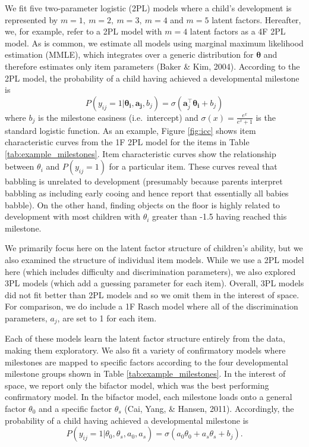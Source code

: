 \documentclass[10pt, letterpaper]{article}
\begin{document}
We fit five two-parameter logistic (2PL) models where a child's
development is represented by \(m = 1, \ m = 2, \ m = 3, \ m = 4\) and
\(m = 5\) latent factors. Hereafter, we, for example, refer to a 2PL
model with \(m = 4\) latent factors as a 4F 2PL model. As is common, we
estimate all models using marginal maximum likelihood estimation (MMLE),
which integrates over a generic distribution for \(\boldsymbol{\theta}\)
and therefore estimates only item parameters (Baker \& Kim, 2004).
According to the 2PL model, the probability of a child having achieved a
developmental milestone is \[
P(y_{ij} = 1 | \boldsymbol{\theta_i}, \boldsymbol{a_j}, b_j) = \sigma(\boldsymbol{a}_{j}^{\top}\boldsymbol{\theta_i} + b_j)
\] where \(b_j\) is the milestone easiness (i.e.~intercept) and
\(\sigma(x) = \frac{e^x}{e^x + 1}\) is the standard logistic function.
As an example, Figure \ref{fig:icc} shows item characteristic curves
from the 1F 2PL model for the items in Table
\ref{tab:example_milestones}. Item characteristic curves show the
relationship between \(\theta_i\) and \(P(y_{ij} = 1)\) for a particular
item. These curves reveal that babbling is unrelated to development
(presumably because parents interpret babbling as including early cooing
and hence report that essentially all babies babble). On the other hand,
finding objects on the floor is highly related to development with most
children with \(\theta_i\) greater than -1.5 having reached this
milestone.

We primarily focus here on the latent factor structure of children's
ability, but we also examined the structure of individual item models.
While we use a 2PL model here (which includes difficulty and
discrimination parameters), we also explored 3PL models (which add a
guessing parameter for each item). Overall, 3PL models did not fit
better than 2PL models and so we omit them in the interest of space. For
comparison, we do include a 1F Rasch model where all of the
discrimination parameters, \(a_j\), are set to 1 for each item.

Each of these models learn the latent factor structure entirely from the
data, making them exploratory. We also fit a variety of confirmatory
models where milestones are mapped to specific factors according to the
four developmental milestone groups shown in Table
\ref{tab:example_milestones}. In the interest of space, we report only
the bifactor model, which was the best performing confirmatory model. In
the bifactor model, each milestone loads onto a general factor
\(\theta_0\) and a specific factor \(\theta_s\) (Cai, Yang, \& Hansen,
2011). Accordingly, the probability of a child having achieved a
developmental milestone is \[
P(y_{ij} = 1 | \theta_0, \theta_s, a_0, a_s) = \sigma(a_0\theta_0 + a_s\theta_s + b_j).
\]
\end{document}
